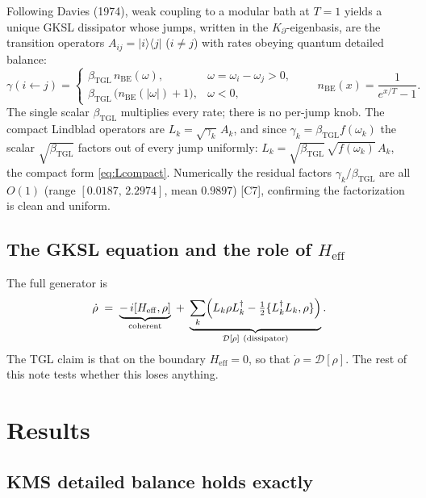 \documentclass[11pt,a4paper]{article}
\theoremstyle{plain}
\theoremstyle{definition}
\newcommand{\Kp}{K_{\partial}}
\newcommand{\beTGL}{\beta_{\mathrm{TGL}}}
\newcommand{\Heff}{H_{\mathrm{eff}}}
\newcommand{\status}[1]{{\small\textsf{[#1]}}}
\begin{document}
Following Davies (1974), weak coupling to a modular bath at $T=1$ yields a unique
GKSL dissipator whose jumps, written in the $\Kp$-eigenbasis, are the transition
operators $A_{ij}=\lvert i\rangle\langle j\rvert$ ($i\ne j$) with rates obeying
quantum detailed balance:
\begin{equation}
  \gamma(i\!\leftarrow\! j)=
  \begin{cases}
    \beTGL\, n_{\mathrm{BE}}(\omega), & \omega = \omega_i-\omega_j > 0,\\[2pt]
    \beTGL\, \bigl(n_{\mathrm{BE}}(\lvert\omega\rvert)+1\bigr), & \omega<0,
  \end{cases}
  \qquad n_{\mathrm{BE}}(x)=\frac{1}{e^{x/T}-1}.
  \label{eq:rates}
\end{equation}
The single scalar $\beTGL$ multiplies every rate; there is no per-jump knob. The
compact Lindblad operators are $L_k=\sqrt{\gamma_k}\,A_k$, and since
$\gamma_k=\beTGL f(\omega_k)$ the scalar $\sqrt{\beTGL}$ factors out of every jump
uniformly: $L_k=\sqrt{\beTGL}\,\sqrt{f(\omega_k)}\,A_k$, the compact form
\eqref{eq:Lcompact}. Numerically the residual factors $\gamma_k/\beTGL$ are all
$O(1)$ (range $[0.0187,\,2.2974]$, mean $0.9897$) \status{C7}, confirming the
factorization is clean and uniform.

\subsection{The GKSL equation and the role of $\Heff$}

The full generator is
\begin{equation}
  \dot\rho \;=\; \underbrace{-\,i[\Heff,\rho]}_{\text{coherent}}
  \;+\;
  \underbrace{\sum_k \Bigl(L_k\rho L_k^\dagger - \tfrac12\{L_k^\dagger L_k,\rho\}\Bigr)}_{\mathcal{D}[\rho]\ \text{(dissipator)}} .
  \label{eq:gksl}
\end{equation}
The TGL claim is that on the boundary $\Heff=0$, so that $\dot\rho=\mathcal{D}[\rho]$.
The rest of this note tests whether this loses anything.

\section{Results}\label{sec:results}

\subsection{KMS detailed balance holds exactly}
\end{document}
